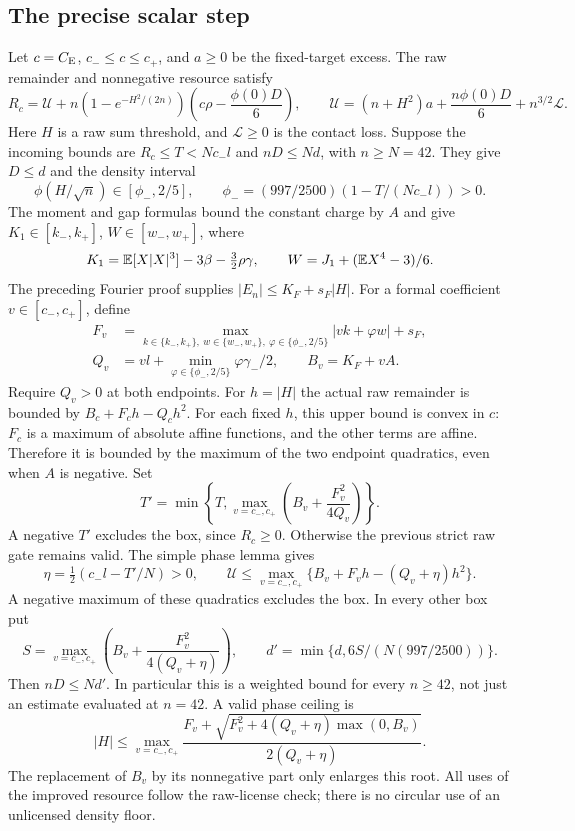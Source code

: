 \subsection{The precise scalar step}
Let $c=C_{\rm E}$, $c_-\le c\le c_+$, and $a\ge0$ be the fixed-target
excess. The raw remainder and nonnegative resource satisfy
\[
 R_c=\mathcal U+n(1-e^{-H^2/(2n)})
          \left(c\rho-\frac{\phi(0)D}{6}\right),\qquad
 \mathcal U=(n+H^2)a+\frac{n\phi(0)D}{6}+n^{3/2}\mathcal L.
\]
Here $H$ is a raw sum threshold, and $\mathcal L\ge0$ is the contact loss.
Suppose the incoming bounds are $R_c\le T<Nc_-l$ and $nD\le Nd$,
with $n\ge N=42$. They give $D\le d$ and the density interval
\[
 \phi(H/\sqrt n)\in[\phi_-,2/5],\qquad
 \phi_-=(997/2500)(1-T/(Nc_-l))>0.
\]
The moment and gap formulas bound the constant charge by $A$ and give
$K_1\in[k_-,k_+]$, $W\in[w_-,w_+]$, where
\[
 K_1=\mathbb E[X|X|^3]-3\beta-\tfrac32\rho\gamma,
 \qquad W=J_1+(\mathbb E X^4-3)/6.
\]
The preceding Fourier proof supplies $|E_n|\le K_F+s_F|H|$.
For a formal coefficient $v\in[c_-,c_+]$, define
\begin{align*}
 F_v&=\max_{k\in\{k_-,k_+\},\ w\in\{w_-,w_+\},\ \varphi\in\{\phi_-,2/5\}}
                       |vk+\varphi w|+s_F,\\
 Q_v&=vl+\min_{\varphi\in\{\phi_-,2/5\}}\varphi\gamma_-/2,
 \qquad B_v=K_F+vA.
\end{align*}
Require $Q_v>0$ at both endpoints. For $h=|H|$ the actual raw remainder
is bounded by $B_c+F_ch-Q_ch^2$. For each fixed $h$, this upper bound is
convex in $c$: $F_c$ is a maximum of absolute affine functions, and the
other terms are affine. Therefore it is bounded by the maximum of the
two endpoint quadratics, even when $A$ is negative.
Set
\[
 T'=\min\left\{T,\max_{v=c_-,c_+}
                    \left(B_v+\frac{F_v^2}{4Q_v}\right)\right\}.
\]
A negative $T'$ excludes the box, since $R_c\ge0$. Otherwise the previous
strict raw gate remains valid. The simple phase lemma gives
\[
 \eta=\tfrac12(c_-l-T'/N)>0,\qquad
 \mathcal U\le\max_{v=c_-,c_+}
                    \{B_v+F_vh-(Q_v+\eta)h^2\}.
\]
A negative maximum of these quadratics excludes the box. In every other
box put
\[
 S=\max_{v=c_-,c_+}\left(B_v+\frac{F_v^2}{4(Q_v+\eta)}\right),
 \qquad d'=\min\{d,6S/(N(997/2500))\}.
\]
Then $nD\le Nd'$. In particular this is a weighted bound for every
$n\ge42$, not just an estimate evaluated at $n=42$. A valid phase ceiling is
\[
 |H|\le\max_{v=c_-,c_+}
 \frac{F_v+\sqrt{F_v^2+4(Q_v+\eta)\max(0,B_v)}}{2(Q_v+\eta)}.
\]
The replacement of $B_v$ by its nonnegative part only enlarges this root.
All uses of the improved resource follow the raw-license check; there is
no circular use of an unlicensed density floor.

